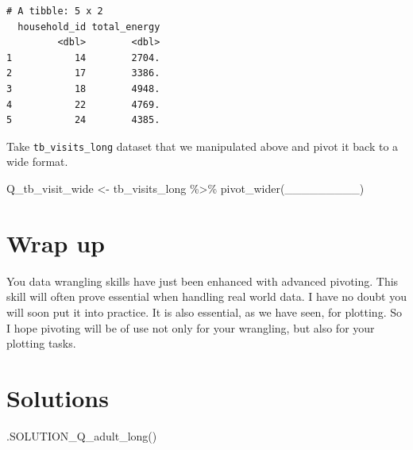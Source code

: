 \documentclass[
  letterpaper,
  DIV=11,
  numbers=noendperiod]{scrreprt}
\newenvironment{Shaded}{\begin{snugshade}}{\end{snugshade}}
\newcommand{\FunctionTok}[1]{\textcolor[rgb]{0.28,0.35,0.67}{#1}}
\newcommand{\NormalTok}[1]{\textcolor[rgb]{0.00,0.23,0.31}{#1}}
\newcommand{\OtherTok}[1]{\textcolor[rgb]{0.00,0.23,0.31}{#1}}
\newcommand{\SpecialCharTok}[1]{\textcolor[rgb]{0.37,0.37,0.37}{#1}}
\begin{document}
\begin{verbatim}
# A tibble: 5 x 2
  household_id total_energy
         <dbl>        <dbl>
1           14        2704.
2           17        3386.
3           18        4948.
4           22        4769.
5           24        4385.
\end{verbatim}

\begin{tcolorbox}[enhanced jigsaw, titlerule=0mm, colback=white, left=2mm, breakable, opacitybacktitle=0.6, colbacktitle=quarto-callout-tip-color!10!white, colframe=quarto-callout-tip-color-frame, bottomtitle=1mm, opacityback=0, coltitle=black, arc=.35mm, toptitle=1mm, title=\textcolor{quarto-callout-tip-color}{\faLightbulb}\hspace{0.5em}{Practice}, leftrule=.75mm, toprule=.15mm, bottomrule=.15mm, rightrule=.15mm]

Take \texttt{tb\_visits\_long} dataset that we manipulated above and
pivot it back to a wide format.

\begin{Shaded}
\begin{Highlighting}[]
\NormalTok{Q\_tb\_visit\_wide }\OtherTok{\textless{}{-}}
\NormalTok{  tb\_visits\_long }\SpecialCharTok{\%\textgreater{}\%}
  \FunctionTok{pivot\_wider}\NormalTok{(\_\_\_\_\_\_\_\_\_)}
\end{Highlighting}
\end{Shaded}

\end{tcolorbox}

\section{Wrap up}\label{wrap-up-9}

You data wrangling skills have just been enhanced with advanced
pivoting. This skill will often prove essential when handling real world
data. I have no doubt you will soon put it into practice. It is also
essential, as we have seen, for plotting. So I hope pivoting will be of
use not only for your wrangling, but also for your plotting tasks.

\section{Solutions}\label{solutions-8}

\begin{Shaded}
\begin{Highlighting}[]
\FunctionTok{.SOLUTION\_Q\_adult\_long}\NormalTok{()}
\end{Highlighting}
\end{Shaded}
\end{document}
